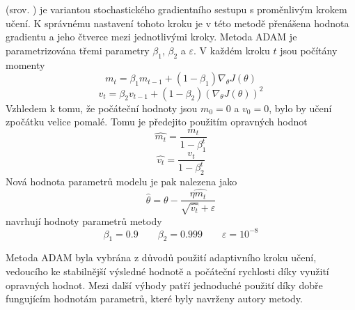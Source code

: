  (srov. \cite{kingma_adam:_2014}) je variantou stochastického gradientního sestupu s proměnlivým krokem učení. K správnému nastavení tohoto kroku je v této metodě přenášena hodnota gradientu a jeho čtverce mezi jednotlivými kroky. Metoda ADAM je parametrizována třemi parametry \( \beta_1 \), \( \beta_2 \) a \( \varepsilon \). V každém kroku \( t \) jsou počítány momenty
\[ m_t = \beta_1 m_{t - 1} + \left( 1 - \beta_1 \right) \nabla_{\theta} J \left( \theta \right) \]
\[ v_t = \beta_2 v_{t - 1} + \left( 1 - \beta_2 \right) \left( \nabla_{\theta} J \left( \theta \right) \right)^2 \]
Vzhledem k tomu, že počáteční hodnoty jsou \( m_0 = 0 \) a \( v_0 = 0 \), bylo by učení zpočátku velice pomalé. Tomu je předejito použitím opravných hodnot
\[ \hat{m_t} = \frac{m_t}{1 - \beta_1^t} \]
\[ \hat{v_t} = \frac{v_t}{1 - \beta_2^t} \]
Nová hodnota parametrů modelu je pak nalezena jako
\[ \hat \theta = \theta - \frac{\eta \hat{m_t}}{\sqrt{\hat{v_t}} + \varepsilon} \]
\cite{kingma_adam:_2014} navrhují hodnoty parametrů metody
\[ \beta_1 = 0.9 \qquad \beta_2 = 0.999 \qquad \varepsilon = 10^{-8} \]

Metoda ADAM byla vybrána z důvodů použití adaptivního kroku učení, vedoucího ke stabilnější výsledné hodnotě a počáteční rychlosti díky využití opravných hodnot. Mezi další výhody patří jednoduché použití díky dobře fungujícím hodnotám parametrů, které byly navrženy autory metody.
